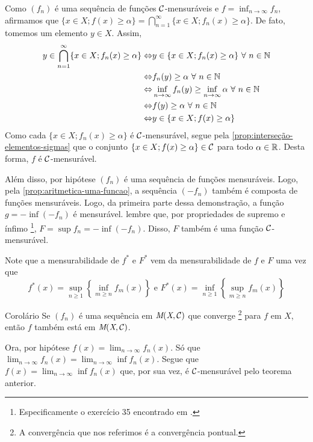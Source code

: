 \begin{prova}
	Como $(f_n)$ é uma sequência de funções $\operatorname{\mathcal{C}}$-mensuráveis e 
	$\displaystyle f = \inf_{n \to \infty} f_n$, afirmamos que $\{x \in X; f(x) \geq \alpha\} = \displaystyle \bigcap_{n = 1}^\infty \{x \in X; f_n(x) \geq \alpha\}$.
	De fato, tomemos um elemento $y \in X$.
	Assim, 
		\begin{align*}
			y \in \bigcap_{n = 1}^\infty \{x \in X; f_n(x) \geq \alpha\} 
			\Leftrightarrow&
			y \in \{x \in X; f_n(x) \geq \alpha\}\ \forall\  n \in \N\\
			\Leftrightarrow&	
			f_n(y) \geq \alpha\ \forall \ n \in \N \\
			\Leftrightarrow	&	
			\inf_{n \to \infty}f_n(y) \geq \inf_{n \to \infty}\alpha\ \forall \ n \in \N\\
			\Leftrightarrow	&	
			f(y) \geq \alpha\ \forall\  n \in \N\\
			\Leftrightarrow	&
			y \in \{x \in X; f(x) \geq \alpha\}
		\end{align*}
	Como cada $\{x \in X; f_n(x) \geq \alpha\}$ é $\operatorname{\mathcal{C}}$-mensurável, segue pela \ref{prop:interseção-elementos-sigmas} que o conjunto $\{x \in X; f(x) \geq \alpha\} \in \operatorname{\mathcal{C}}$ para todo $\alpha \in \mathbb{R}$.
	Desta forma, $f$ é $\operatorname{\mathcal{C}}$-mensurável.
	
	Além disso, por hipótese $(f_n)$ é uma sequência de funções mensuráveis.
	Logo, pela \ref{prop:aritmetica-uma-funcao}, a sequência $(-f_n)$ também é composta de funções mensuráveis.
	Logo, da primeira parte dessa demonstração, a função 
	$ g = -\inf (-f_n)$ é mensurável.
	lembre que, por propriedades de supremo e ínfimo
	\footnote{
		Especificamente o exercício 35 encontrado em \cite[p.92]{elon}.
		}, 
	$F = \sup f_n = -\inf(-f_n)$. 
	Disso, $F$ também é uma função $\operatorname{\mathcal{C}}$-mensurável.
	
	Note que a mensurabilidade de $f^*$ e $F^*$ vem da mensurabilidade de $f$ e $F$ uma vez que
	$$
	f^*(x) = \sup_{n \geq 1} \left\{\inf_{m \geq n} f_m(x)\right\}
	\textrm{\ e\ }
	F^*(x) = \inf_{n \geq 1} \left\{\sup_{m \geq n} f_m(x)\right\}
	$$
\end{prova}
\begin{env}{Corolário}
	\label{cor:convergencia-de-uma-sequencia-mensuravel}
	Se $(f_n)$ é uma sequência em $\operatorname{\textit{M}(\textit{X}, \mathcal{C} )}$ que converge
	\footnote{
		A convergência que nos referimos é a convergência pontual.
	} para $f$ em $X$, então
	$f$ também está em $\operatorname{\textit{M}(\textit{X}, \mathcal{C} )}$.
\end{env}
\begin{prova}
	Ora, por hipótese $\displaystyle f(x) = \lim_{n \to \infty} f_n(x)$.
	Só que $\displaystyle \lim_{n \to \infty} f_n(x) = \lim_{n \to \infty} \inf f_n(x)$.
	Segue que $\displaystyle f(x) = \lim_{n \to \infty} \inf f_n(x)$ que, por sua vez, é $\operatorname{\mathcal{C}}$-mensurável pelo teorema anterior.
\end{prova}

